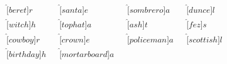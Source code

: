 \documentclass{article}
\begin{document}
\vspace*{-9mm}
\begin{align*}
\hat[beret]{r}&&
\hat[santa]{e}&&
\hat[sombrero]{a}&&
\hat[dunce]{l}\\
\hat[witch]{h}&&
\hat[tophat]{a}&&
\hat[ash]{t}&&
\hat[fez]{s}\\
\hat[cowboy]{r}&&
\hat[crown]{e}&&
\hat[policeman]{a}&&
\hat[scottish]{l}\\
\hat[birthday]{h}&&
\hat[mortarboard]{a}
\end{align*}
\end{document}
